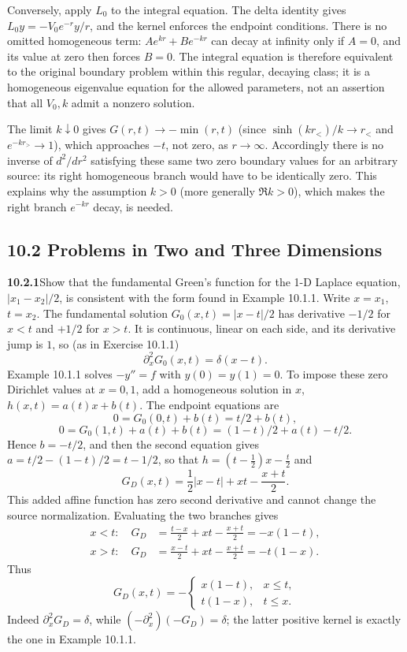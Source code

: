 Conversely, apply $L_0$ to the integral equation. The delta identity
gives $L_0y=-V_0e^{-r}y/r$, and the kernel enforces the endpoint
conditions. There is no omitted homogeneous term: $Ae^{kr}+Be^{-kr}$
can decay at infinity only if $A=0$, and its value at zero then forces
$B=0$. The integral equation is therefore equivalent to the original
boundary problem within this regular, decaying class; it is a homogeneous
eigenvalue equation for the allowed parameters, not an assertion that
all $V_0,k$ admit a nonzero solution.

The limit $k\downarrow0$ gives $G(r,t)\to-\min(r,t)$ (since
$\sinh(kr_<)/k\to r_<$ and $e^{-kr_>}\to1$), which approaches
$-t$, not zero, as $r\to\infty$. Accordingly there is no inverse of
$d^2/dr^2$ satisfying these same two zero boundary values for an arbitrary
source: its right homogeneous branch would have to be identically zero.
This explains why the assumption $k>0$ (more generally $\Re k>0$),
which makes the right branch $e^{-kr}$ decay, is needed.

\subsection*{10.2 Problems in Two and Three Dimensions}

\par\bigskip
\noindent\textbf{10.2.1}\quad Show that the fundamental Green's function for
the 1-D Laplace equation, $|x_{1}-x_{2}|/2$, is consistent with the form found
in Example 10.1.1.
\solution
Write $x=x_1$, $t=x_2$. The fundamental solution
$G_0(x,t)=|x-t|/2$ has derivative $-1/2$ for $x<t$ and $+1/2$ for
$x>t$. It is continuous, linear on each side, and its derivative jump
is $1$, so (as in Exercise 10.1.1)
\[
\partial_x^2G_0(x,t)=\delta(x-t).
\]
Example 10.1.1 solves $-y''=f$ with $y(0)=y(1)=0$. To impose these zero
Dirichlet values at $x=0,1$, add a homogeneous solution
in $x$, $h(x,t)=a(t)x+b(t)$. The endpoint equations are
\[
0=G_0(0,t)+b(t)=t/2+b(t),
\]
\[
0=G_0(1,t)+a(t)+b(t)=(1-t)/2+a(t)-t/2.
\]
Hence $b=-t/2$, and then the second equation gives
$a=t/2-(1-t)/2=t-1/2$, so that $h=(t-\frac12)x-\frac t2$ and
\[
G_D(x,t)=\frac12|x-t|+xt-\frac{x+t}{2}.
\]
This added affine function has zero second derivative and cannot change
the source normalization. Evaluating the two branches gives
\begin{align*}
x<t:\quad G_D&=\frac{t-x}{2}+xt-\frac{x+t}{2}
=-x(1-t),\\
x>t:\quad G_D&=\frac{x-t}{2}+xt-\frac{x+t}{2}
=-t(1-x).
\end{align*}
Thus
\[
\boxed{G_D(x,t)=-\begin{cases}x(1-t),&x\le t,\\t(1-x),&t\le x.\end{cases}}
\]
Indeed $\partial_x^2G_D=\delta$, while
$(-\partial_x^2)(-G_D)=\delta$; the latter positive kernel is exactly
the one in Example 10.1.1.

